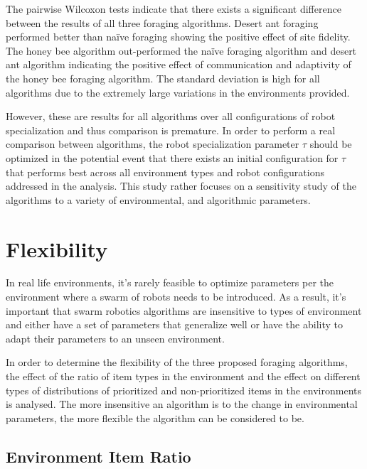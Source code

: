The pairwise Wilcoxon tests indicate that there exists a significant difference between the results of all three foraging algorithms. Desert ant foraging performed better than na\"ive foraging showing the positive effect of site fidelity. The honey bee algorithm out-performed the na\"ive foraging algorithm and desert ant algorithm indicating the positive effect of communication and adaptivity of the honey bee foraging algorithm. The standard deviation is high for all algorithms due to the extremely large variations in the environments provided.

However, these are results for all algorithms over all configurations of robot specialization and thus comparison is premature. In order to perform a real comparison between algorithms, the robot specialization parameter $\tau$ should be optimized in the potential event that there exists an initial configuration for $\tau$ that performs best across all environment types and robot configurations addressed in the analysis. This study rather focuses on a sensitivity study of the algorithms to a variety of environmental, and algorithmic parameters.


\section{Flexibility}
\label{results:flexibility}

In real life environments, it's rarely feasible to optimize parameters per the environment where a swarm of robots needs to be introduced. As a result, it's important that swarm robotics algorithms are insensitive to types of environment and either have a set of parameters that generalize well or have the ability to adapt their parameters to an unseen environment.

In order to determine the flexibility of the three proposed foraging algorithms, the effect of the ratio of item types in the environment and the effect on different types of distributions of prioritized and non-prioritized items in the environments is analysed. The more insensitive an algorithm is to the change in environmental parameters, the more flexible the algorithm can be considered to be. 

\subsection{Environment Item Ratio}
\label{results:ratio}

